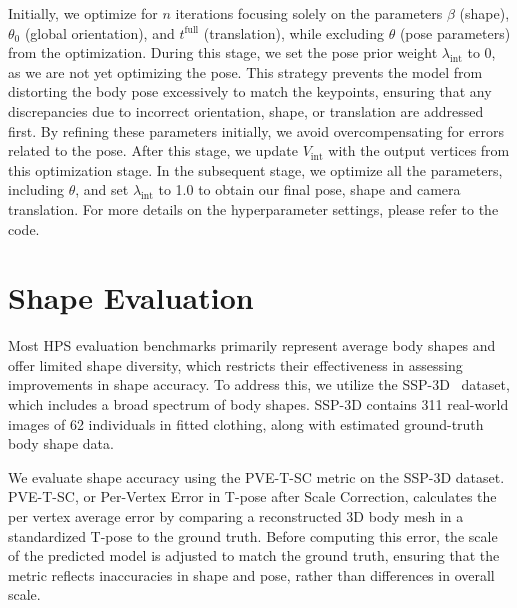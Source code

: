 Initially, we optimize for $n$ iterations focusing solely on the parameters $\beta$ (shape), $\theta_0$ (global orientation), and $t^{\text{full}}$ (translation), while excluding $\theta$ (pose parameters) from the optimization. During this stage, we set the pose prior weight $\lambda_{\text{int}}$ to 0, as we are not yet optimizing the pose. This strategy prevents the model from distorting the body pose excessively to match the keypoints, ensuring that any discrepancies due to incorrect orientation, shape, or translation are addressed first. By refining these parameters initially, we avoid overcompensating for errors related to the pose. After this stage, we update $V_{\text{int}}$ with the output vertices from this optimization stage.
In the subsequent stage, we optimize all the parameters, including $\theta$, and set $\lambda_{\text{int}}$ to 1.0 to obtain our final pose, shape and camera translation. For more details on the hyperparameter settings, please refer to the code.


\section{Shape Evaluation}
Most HPS evaluation benchmarks primarily represent average body shapes and offer limited shape diversity, which restricts their effectiveness in assessing improvements in shape accuracy. To address this, we utilize the SSP-3D~\cite{ssp} dataset, which includes a broad spectrum of body shapes. SSP-3D contains 311 real-world images of 62 individuals in fitted clothing, along with estimated ground-truth body shape data.

We evaluate shape accuracy using the PVE-T-SC metric on the SSP-3D dataset. PVE-T-SC, or Per-Vertex Error in T-pose after Scale Correction, calculates the per vertex average error by comparing a reconstructed 3D body mesh in a standardized T-pose to the ground truth. Before computing this error, the scale of the predicted model is adjusted to match the ground truth, ensuring that the metric reflects inaccuracies in shape and pose, rather than differences in overall scale.

